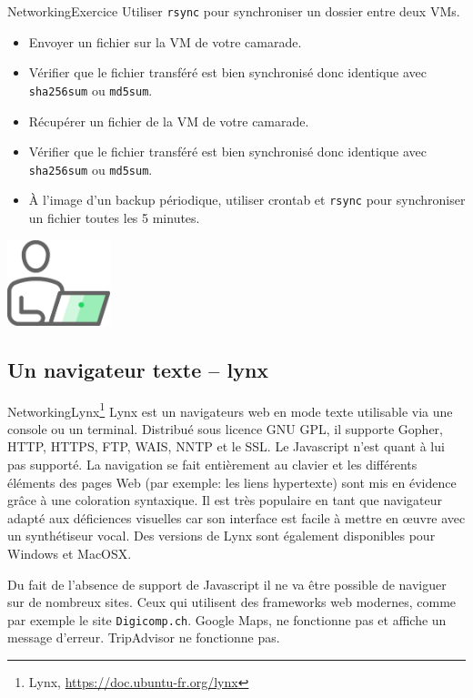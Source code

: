 \documentclass{beamer}
\begin{document}
    \begin{frame}{Networking}{Exercice \execcounterdispinc}
        Utiliser \lstinline{rsync} pour synchroniser un dossier entre deux VMs.
        \begin{itemize}
            \item Envoyer un fichier sur la VM de votre camarade.
            \item Vérifier que le fichier transféré est bien synchronisé donc identique avec \lstinline{sha256sum} ou \lstinline{md5sum}.
            \item Récupérer un fichier de la VM de votre camarade.
            \item Vérifier que le fichier transféré est bien synchronisé donc identique avec \lstinline{sha256sum} ou \lstinline{md5sum}.
            \item À l'image d'un backup périodique, utiliser crontab et \lstinline{rsync} pour synchroniser un fichier toutes les 5 minutes.
        \end{itemize}
        \begin{center}
            \includegraphics[width=3cm]{image/guy-in-front-of-desktop}
        \end{center}
    \end{frame}

    \subsection{Un navigateur texte – lynx}\label{subsec:lynx}

    \begin{frame}{Networking}{Lynx\footnote{Lynx, \url{https://doc.ubuntu-fr.org/lynx}}}
        Lynx est un navigateurs web en mode texte utilisable via une console ou un terminal.
        Distribué sous licence GNU GPL, il supporte Gopher, HTTP, HTTPS, FTP, WAIS, NNTP et le SSL. Le Javascript n'est quant à lui pas supporté.
        La navigation se fait entièrement au clavier et les différents éléments des pages Web (par exemple: les liens hypertexte) sont mis en évidence grâce à une coloration syntaxique.
        Il est très populaire en tant que navigateur adapté aux déficiences visuelles car son interface est facile à mettre en œuvre avec un synthétiseur vocal.
        Des versions de Lynx sont également disponibles pour Windows et MacOSX.
        \begin{dangercolorbox}
            Du fait de l'absence de support de Javascript il ne va être possible de naviguer sur de nombreux sites.
            Ceux qui utilisent des frameworks web modernes, comme par exemple le site \lstinline{Digicomp.ch}.
            Google Maps, ne fonctionne pas et affiche un message d'erreur.
            TripAdvisor ne fonctionne pas.
        \end{dangercolorbox}
    \end{frame}
\end{document}
